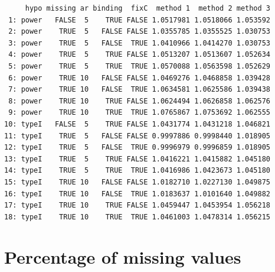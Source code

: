 \documentclass[12pt]{article}
\begin{document}
\begin{verbatim}
     hypo missing ar binding  fixC  method 1  method 2 method 3
 1: power   FALSE  5    TRUE FALSE 1.0517981 1.0518066 1.053592
 2: power    TRUE  5   FALSE FALSE 1.0355785 1.0355525 1.030753
 3: power    TRUE  5   FALSE  TRUE 1.0410966 1.0414270 1.030753
 4: power    TRUE  5    TRUE FALSE 1.0513207 1.0513607 1.052634
 5: power    TRUE  5    TRUE  TRUE 1.0570088 1.0563598 1.052629
 6: power    TRUE 10   FALSE FALSE 1.0469276 1.0468858 1.039428
 7: power    TRUE 10   FALSE  TRUE 1.0634581 1.0625586 1.039438
 8: power    TRUE 10    TRUE FALSE 1.0624494 1.0626858 1.062576
 9: power    TRUE 10    TRUE  TRUE 1.0765867 1.0753692 1.062555
10: typeI   FALSE  5    TRUE FALSE 1.0431774 1.0431218 1.046821
11: typeI    TRUE  5   FALSE FALSE 0.9997886 0.9998440 1.018905
12: typeI    TRUE  5   FALSE  TRUE 0.9996979 0.9996859 1.018905
13: typeI    TRUE  5    TRUE FALSE 1.0416221 1.0415882 1.045180
14: typeI    TRUE  5    TRUE  TRUE 1.0416986 1.0423673 1.045180
15: typeI    TRUE 10   FALSE FALSE 1.0182710 1.0227130 1.049875
16: typeI    TRUE 10   FALSE  TRUE 1.0183637 1.0101640 1.049882
17: typeI    TRUE 10    TRUE FALSE 1.0459447 1.0453954 1.056218
18: typeI    TRUE 10    TRUE  TRUE 1.0461003 1.0478314 1.056215
\end{verbatim}

\section{Percentage of missing values}
\label{sec:org911d30a}
\end{document}
